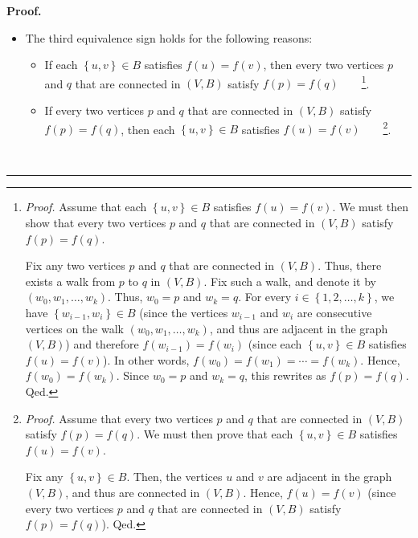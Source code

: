 \documentclass[numbers=enddot,12pt,final,onecolumn,notitlepage]{scrartcl}%
\theoremstyle{definition}
\newenvironment{proof}[1][Proof]{\noindent\textbf{#1.} }{\ \rule{0.5em}{0.5em}}
\newcommand{\set}[1]{\left\{ #1 \right\}}
\newcommand{\tup}[1]{\left( #1 \right)}
\begin{document}
\begin{proof}
\begin{itemize}
\item The third equivalence sign holds for the following reasons:

\begin{itemize}
\item If each $ \set{u, v} \in B$ satisfies $f \tup{u} = f \tup{v}$,
then every two vertices $p$ and $q$ that are connected
in $ \tup{V, B} $ satisfy
$f \tup{p} = f \tup{q}$\ \ \ \ \footnote{\textit{Proof.}
    Assume that each $ \set{u, v} \in
    B$ satisfies $f \tup{u} = f \tup{v}$. We must then show that
    every two vertices $p$ and $q$ that are connected in $\tup{V, B}$
    satisfy $f \tup{p} = f \tup{q}$.
    \par
    Fix any two vertices $p$ and $q$ that are connected in $ \tup{V, B} $.
    Thus, there exists a walk from $p$ to $q$ in $ \tup{V, B} $. Fix such
    a walk, and denote it by $\left(  w_{0},w_{1},\ldots,w_{k}\right)  $. Thus,
    $w_{0}=p$ and $w_{k}=q$. For every $i\in \set{1, 2, \ldots, k} $, we
    have $\left\{  w_{i-1},w_{i}\right\}  \in B$ (since the vertices $w_{i-1}$ and
    $w_{i}$ are consecutive vertices on the walk $\left(  w_{0},w_{1},\ldots
    ,w_{k}\right)  $, and thus are adjacent in the graph $ \tup{V, B} $)
    and therefore $f\left(  w_{i-1}\right)  =f\left(  w_{i}\right)  $ (since each
    $ \set{u, v} \in B$ satisfies $f\left(  u\right)  =f\left(
    v\right)  $). In other words, $f\left(  w_{0}\right)  =f\left(  w_{1}\right)
    =\cdots=f\left(  w_{k}\right)  $. Hence, $f\left(  w_{0}\right)  =f\left(
    w_{k}\right)  $. Since $w_{0}=p$ and $w_{k}=q$, this rewrites as $f\left(
    p\right)  =f\left(  q\right)  $. Qed.}.

\item If every two vertices $p$ and $q$ that are connected in $\left(
V,B\right)  $ satisfy $f\left(  p\right)  =f\left(  q\right)  $, then each
$ \set{u, v} \in B$ satisfies $f\left(  u\right)  =f\left(
v\right)  $\ \ \ \ \footnote{\textit{Proof.}
    Assume that every two vertices
    $p$ and $q$ that are connected in $ \tup{V, B} $ satisfy
    $f \tup{p} = f \tup{q}$. We must then prove that each
    $\set{u, v} \in B$ satisfies $f \tup{u} = f \tup{v}$.
    \par
    Fix any $\set{u, v} \in B$. Then, the vertices $u$ and $v$ are
    adjacent in the graph $\tup{V, B}$, and thus are connected in
    $\tup{V, B}$.
    Hence, $f \tup{u} = f \tup{v}$
    (since every two vertices $p$ and $q$ that are connected in
    $\tup{V, B}$ satisfy $f \tup{p} = f \tup{q}$). Qed.}.
\end{itemize}
\end{itemize}


\end{proof}
\end{document}
